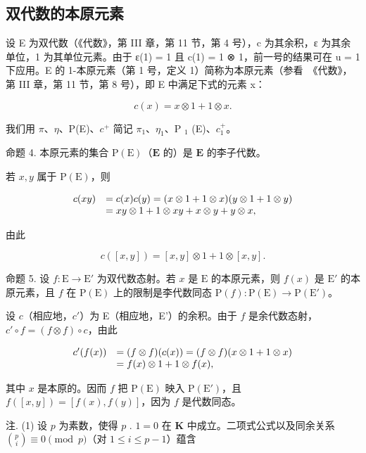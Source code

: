 \subsection{双代数的本原元素}

设 E 为双代数（《代数》，第 III 章，第 11 节，第 4 号），c 为其余积，ε 为其余单位，1 为其单位元素。由于 ε(1) = 1 且 c(1) = 1 ⊗ 1，前一号的结果可在 u = 1 下应用。E 的 1-本原元素（第 1 号，定义 1）简称为本原元素（参看~《代数》，第 III 章，第 11 节，第 8 号），即 E 中满足下式的元素 x：

\[
c (x) = x \otimes 1 + 1 \otimes x.\tag{5}
\]

我们用 \(\pi\)、\(\eta\)、P(E)、\(c^{+}\) 简记 \(\pi_{1}\)、\(\eta_{1}\)、P \(_{1}\) (E)、\(c_{1}^{+}\)。

命题 4. 本原元素的集合 \(\mathrm{P(E)}\)（\(\mathbf{E}\) 的）是 \(\mathbf{E}\) 的李子代数。

若 \(x, y\) 属于 \(\mathrm{P(E)}\)，则

\[
\begin{array}{r l} c (x y) & = c (x) c (y) = (x \otimes 1 + 1 \otimes x) (y \otimes 1 + 1 \otimes y) \\ & = x y \otimes 1 + 1 \otimes x y + x \otimes y + y \otimes x, \end{array}
\]

由此

\[
c ([ x, y ]) = [ x, y ] \otimes 1 + 1 \otimes [ x, y ].
\]

命题 5. 设 \(f: \mathrm{E} \to \mathrm{E}'\) 为双代数态射。若 \(x\) 是 \(\mathrm{E}\) 的本原元素，则 \(f(x)\) 是 \(\mathrm{E}'\) 的本原元素，且 \(f\) 在 \(\mathrm{P(E)}\) 上的限制是李代数同态 \(\mathrm{P}(f): \mathrm{P(E)} \to \mathrm{P(E')}\)。

设 \(c\)（相应地，\(c'\)）为 E（相应地，E'）的余积。由于 \(f\) 是余代数态射，\(c' \circ f = (f \otimes f) \circ c\)，由此

\[
\begin{array}{r l} c ^ {\prime} (f (x)) & = (f \otimes f) (c (x)) = (f \otimes f) (x \otimes 1 + 1 \otimes x) \\ & = f (x) \otimes 1 + 1 \otimes f (x), \end{array}
\]

其中 \(x\) 是本原的。因而 \(f\) 把 \(\mathrm{P(E)}\) 映入 \(\mathrm{P(E')}\)，且 \(f([x,y]) = [f(x),f(y)]\)，因为 \(f\) 是代数同态。

注. (1) 设 \(p\) 为素数，使得 \(p\) . \(1 = 0\) 在 \(\mathbf{K}\) 中成立。二项式公式以及同余关系 \(\binom{p}{i} \equiv 0 \pmod{p}\)（对 \(1 \leqslant i \leqslant p - 1\)）蕴含

